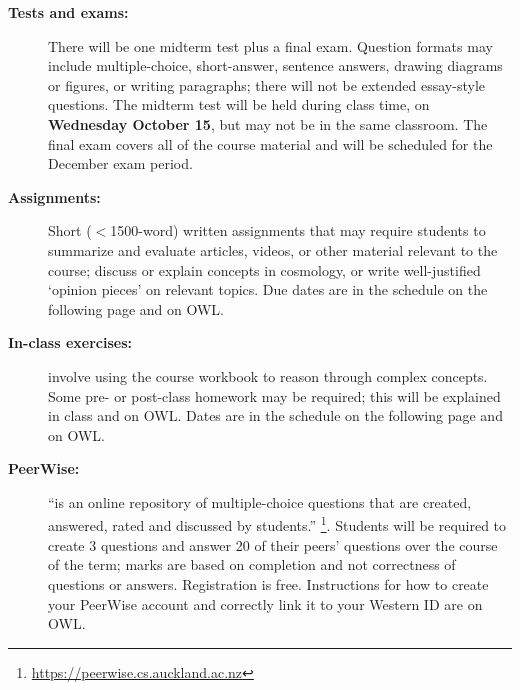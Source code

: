 \documentclass[12pt]{article}
\begin{document}
\begin{description}
\item[\bf Tests and exams:] There will be one midterm test plus a final exam. 
Question formats may include multiple-choice, short-answer, sentence answers, drawing diagrams or figures, or writing paragraphs;
there will not be extended essay-style questions. 
The midterm test will be held during class time, on {\bf  Wednesday October 15}, but may not be in the same classroom.
The final exam covers all of the course material and will be scheduled for the December exam period.

\item[\bf Assignments:] Short ($<$1500-word) written assignments that may require students to summarize and evaluate articles, videos, or
other material relevant to the course; discuss or explain concepts in cosmology, or write well-justified `opinion pieces' on relevant topics.
Due dates are in the schedule on the following page and on OWL.

\item[\bf In-class exercises:] involve using the course workbook to reason through complex concepts. Some pre- or post-class homework
may be required; this will be explained in class and on OWL. Dates are in the schedule on the following page and on OWL.

\item[\bf PeerWise:]  ``is an online repository of multiple-choice questions that are created, answered, rated and discussed by students.''%
\footnote{\url{https://peerwise.cs.auckland.ac.nz}}.  Students will be required to create 3 questions and answer
20 of their peers' questions over the course of the term; marks are based on completion and not correctness of questions or answers.
Registration is free. Instructions for how to create your PeerWise account and correctly link it to your Western ID are on OWL.

\end{description}

\clearpage

\end{document}
